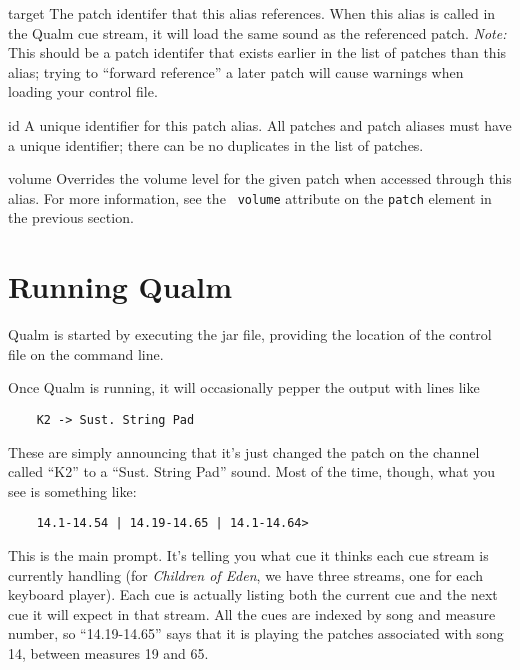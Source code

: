 \documentclass{article}
\newcommand{\q}{{\textsf{Qualm}}\xspace}
\newcommand{\attrlabel}[1]{\mbox{{\ttfamily\itshape #1}}~~--}
\newenvironment{attributes}
  {\list{}{\let\makelabel\attrlabel}}
  {\endlist}
\begin{document}
\begin{attributes}
\item[target] The patch identifer that this alias references.  When
  this alias is called in the \q cue stream, it will load the same
  sound as the referenced patch.  {\em Note:} This should be a patch
  identifer that exists earlier in the list of patches than this
  alias; trying to ``forward reference'' a later patch will cause
  warnings when loading your control file.
\item[id] A unique identifier for this patch alias.  All patches and
  patch aliases must have a unique identifier; there can be no
  duplicates in the list of patches.
\item[volume] Overrides the volume level for the given patch when
  accessed through this alias.  For more information, see the {\tt
    volume} attribute on the {\tt patch} element in the previous
  section.
\end{attributes}

\begin{latexonly}\newpage\end{latexonly}
\section{Running \q}

\q is started by executing the jar file, providing the location of the
control file on the command line.

Once \q is running, it will occasionally pepper the output with lines
like

\begin{verbatim}
    K2 -> Sust. String Pad
\end{verbatim}

These are simply announcing that it's just changed the patch on the
channel called ``K2'' to a ``Sust. String Pad'' sound.  Most of the time,
though, what you see is something like:

\begin{verbatim}
    14.1-14.54 | 14.19-14.65 | 14.1-14.64>
\end{verbatim}

This is the main prompt.  It's telling you what cue it thinks each cue
stream is currently handling (for {\em Children of Eden}, we have three
streams, one for each keyboard player).  Each cue is actually listing
both the current cue and the next cue it will expect in that stream. 
All the cues are indexed by song and measure number, so ``14.19-14.65''
says that it is playing the patches associated with song 14, between
measures 19 and 65.
\end{document}
